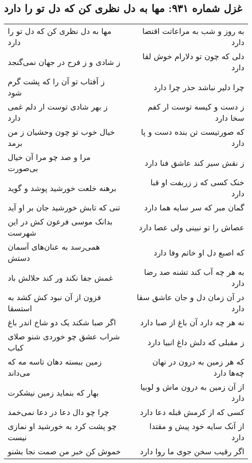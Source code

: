 \begin{center}
\section*{غزل شماره ۹۳۱: مها به دل نظری کن که دل تو را دارد}
\label{sec:0931}
\begin{longtable}{l p{0.5cm} r}
مها به دل نظری کن که دل تو را دارد
&&
به روز و شب به مراعاتت اقتضا دارد
\\
ز شادی و ز فرح در جهان نمی‌گنجد
&&
دلی که چون تو دلارام خوش لقا دارد
\\
ز آفتاب تو آن را که پشت گرم شود
&&
چرا دلیر نباشد حذر چرا دارد
\\
ز بهر شادی توست ار دلم غمی دارد
&&
ز دست و کیسه توست ار کفم سخا دارد
\\
خیال خوب تو چون وحشیان ز من برمد
&&
که صورتیست تن بنده دست و پا دارد
\\
مرا و صد چو مرا آن خیال بی‌صورت
&&
ز نقش سیر کند عاشق فنا دارد
\\
برهنه خلعت خورشید پوشد و گوید
&&
خنک کسی که ز زربفت او قبا دارد
\\
تنی که تابش خورشید جان بر او آید
&&
گمان مبر که سر سایه هما دارد
\\
بدانک موسی فرعون کش در این شهرست
&&
عصاش را تو نبینی ولی عصا دارد
\\
همی‌رسد به عنان‌های آسمان دستش
&&
که اصبع دل او خاتم وفا دارد
\\
غمش جفا نکند ور کند حلالش باد
&&
به هر چه آب کند تشنه صد رضا دارد
\\
فزون از آن نبود کش کشد به استسقا
&&
در آن زمان دل و جان عاشق سقا دارد
\\
اگر صبا شکند یک دو شاخ اندر باغ
&&
نه هر چه دارد آن باغ از صبا دارد
\\
شراب عشق چو خوردی شنو صلای کباب
&&
ز مقبلی که دلش داغ انبیا دارد
\\
زمین ببسته دهان تاسه مه که می‌داند
&&
که هر زمین به درون در نهان چه‌ها دارد
\\
بهار که بنماید زمین نیشکرت
&&
از آن زمین به درون ماش و لوبیا دارد
\\
چرا چو دال دعا در دعا نمی‌خمد
&&
کسی که از کرمش قبله دعا دارد
\\
چو پشت کرد به خورشید او نمازی نیست
&&
از آنک سایه خود پیش و مقتدا دارد
\\
خموش کن خبر من صمت نجا بشنو
&&
اگر رقیب سخن جوی ما روا دارد
\\
\end{longtable}
\end{center}
